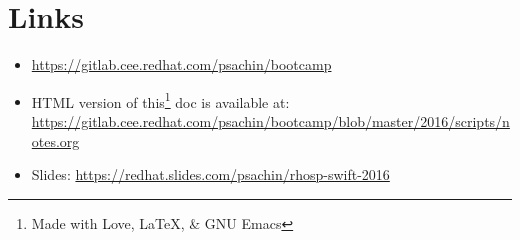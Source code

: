\documentclass{article}
\begin{document}
\section{Links}
\label{sec-6}
\begin{itemize}
\item \url{https://gitlab.cee.redhat.com/psachin/bootcamp}
\item HTML version of this\footnote[1]{Made with Love, \LaTeX, \& GNU Emacs} doc is available at: \newline
     \url{https://gitlab.cee.redhat.com/psachin/bootcamp/blob/master/2016/scripts/notes.org}
\item Slides: \url{https://redhat.slides.com/psachin/rhosp-swift-2016}
\end{itemize}
\end{document}
